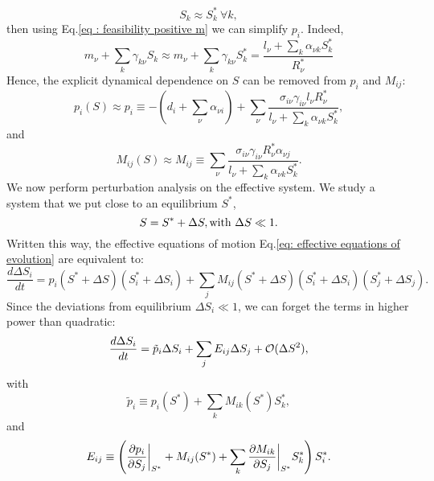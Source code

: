 \documentclass[12pt, titlepage, twoside, openright]{report}
\begin{document}
\begin{equation}
S_k \approx S^*_k \ \forall k,
\end{equation}
then using Eq.\eqref{eq : feasibility positive m} we can simplify $p_i$. Indeed,
\begin{equation}
m_\nu + \sum_k \gamma_{k\nu} S_k \approx m_\nu + \sum_k \gamma_{k\nu}S^*_k = \frac{l_\nu + \sum_k \alpha_{\nu k}S^*_k}{R^*_\nu} \label{eq: equality fluxes resource}
\end{equation}
Hence, the explicit dynamical dependence on $S$ can be removed from $p_i$ and $M_{ij}$:
\begin{equation}
p_i(S) \approx p_i \equiv - \left(d_i + \sum_\nu \alpha_{\nu i}\right) + \sum_\nu \frac{\sigma_{i\nu}\gamma_{i\nu}l_\nu R^*_\nu}{l_\nu + \sum_k \alpha_{\nu k}S^*_k},
\end{equation} and
\begin{equation}
M_{ij}(S) \approx M_{ij} \equiv \sum_\nu \frac{\sigma_{i\nu} \gamma_{i\nu} R^*_\nu \alpha_{\nu j}}{l_\nu + \sum_k{\alpha_{\nu k} S^*_k}}.
\end{equation}
We now perform perturbation analysis on the effective system. We study a system that we put close to an equilibrium $S^*$, \ie
\begin{equation}
S=S^*+\Delta S, \\ \text{with } \Delta S \ll 1.
\end{equation}
Written this way, the effective equations of motion Eq.\eqref{eq: effective equations of evolution} are equivalent to:
\begin{equation}
\frac{d\Delta S_i}{dt} = p_i(S^*+\Delta S)\left(S^*_i + \Delta S_i\right)+\sum_j M_{ij}(S^*+\Delta S)\left(S^*_i +\Delta S_i\right)\left(S^*_j +\Delta S_j\right).
\end{equation}
Since the deviations from equilibrium $\Delta S_i \ll 1$, we can forget the terms in higher power than quadratic:
\begin{equation}
\frac{d\Delta S_i}{dt} = \tilde{p}_i \Delta S_i + \sum_j E_{ij} \Delta S_j + \mathcal{O}(\Delta S^2),\label{eq: effective equ evol at O(D2)}
\end{equation}
with
\begin{equation}
\tilde{p}_i \equiv p_i(S^*) + \sum_k M_{ik}(S^*)S_k^*, \label{eq: tilde p effective system}
\end{equation}
and
\begin{equation}
E_{ij} \equiv \left(\dfrac{\partial p_i}{\partial S_j}\bigg\rvert_{S^*}+M_{ij}(S^*)+\sum_k \dfrac{\partial M_{ik}}{\partial S_j}\bigg\rvert_{S^*}S^*_k\right)S^*_i.
\end{equation}
\end{document}
